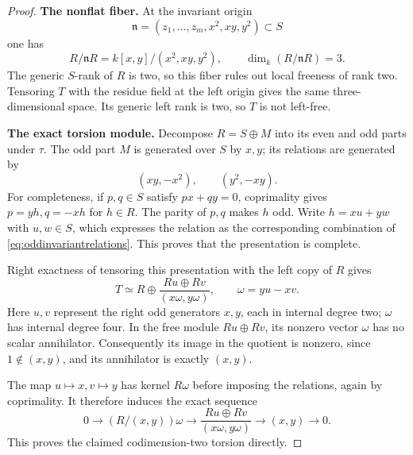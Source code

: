 \begin{proof}
\par\smallskip\noindent\textbf{The nonflat fiber.}\quad
At the invariant origin
\[
 \mathfrak n=(z_1,\ldots,z_m,x^2,xy,y^2)\subset S
\]
one has
\begin{equation}\label{eq:invariantoriginfiber}
 R/\mathfrak nR
       =k[x,y]/(x^2,xy,y^2),
 \qquad \dim_k(R/\mathfrak nR)=3.
\end{equation}
The generic \(S\)-rank of \(R\) is two, so this fiber rules out
local freeness of rank two. Tensoring \(T\) with the residue
field at the left origin gives the same three-dimensional
space. Its generic left rank is two, so \(T\) is not left-free.

\par\smallskip\noindent\textbf{The exact torsion module.}\quad
Decompose \(R=S\oplus M\) into its even and odd parts under
\(\tau\). The odd part \(M\) is generated over \(S\) by \(x,y\);
its relations are generated by
\begin{equation}\label{eq:oddinvariantrelations}
                 (xy,-x^2),\qquad(y^2,-xy).
\end{equation}
For completeness, if \(p,q\in S\) satisfy \(px+qy=0\),
coprimality gives \(p=yh,q=-xh\) for \(h\in R\).
The parity of \(p,q\) makes \(h\) odd. Write
\(h=xu+yw\) with \(u,w\in S\), which expresses the relation
as the corresponding combination of
\eqref{eq:oddinvariantrelations}. This proves that the
presentation is complete.

Right exactness of tensoring this presentation with the left
copy of \(R\) gives
\begin{equation}\label{eq:invarianttorsionpresentation}
 T\simeq R\oplus
       \frac{Ru\oplus Rv}{(x\omega,y\omega)},
 \qquad \omega=yu-xv.
\end{equation}
Here \(u,v\) represent the right odd generators \(x,y\), each
in internal degree two; \(\omega\) has internal degree four.
In the free module \(Ru\oplus Rv\), its nonzero vector
\(\omega\) has no scalar annihilator. Consequently its image
in the quotient is nonzero, since \(1\notin(x,y)\), and its
annihilator is exactly \((x,y)\).

The map \(u\mapsto x,v\mapsto y\) has kernel \(R\omega\)
before imposing the relations, again by coprimality.
It therefore induces the exact sequence
\begin{equation}\label{eq:invarianttorsionsequence}
 0\longrightarrow (R/(x,y))\omega
 \longrightarrow \frac{Ru\oplus Rv}{(x\omega,y\omega)}
 \longrightarrow (x,y)\longrightarrow0.
\end{equation}
This proves the claimed codimension-two torsion directly.


\end{proof}
